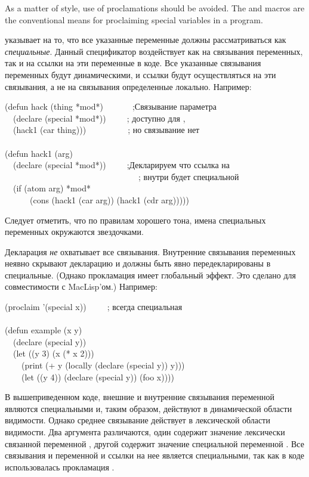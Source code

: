 \begin{flushdesc}
As a matter of style, use of  proclamations should be
avoided.  The  and  macros
are the conventional means for proclaiming special variables
in a program.

\item[\cdf{special}]
 указывает на то, что все указанные
переменные должны рассматриваться как \emph{специальные}.
Данный спецификатор воздействует как на связывания переменных, так и на ссылки
на эти переменные в коде.
Все указанные связывания переменных будут динамическими, и ссылки будут
осуществляться на эти связывания, а не на связывания определенные локально.
Например:
\begin{lisp}
(defun hack (thing *mod*)~~~~~~~;\textrm{Связывание параметра} \\
~~(declare (special *mod*))~~~~~; \textrm{ доступно для ,} \\
~~(hack1 (car thing)))~~~~~~~~~~; \textrm{но связывание  нет} \\
 \\
(defun hack1 (arg) \\
~~(declare (special *mod*))~~~~~;\textrm{Декларируем что ссылка на } \\
~~~~~~~~~~~~~~~~~~~~~~~~~~~~~~~~; \textrm{внутри  будет специальной} \\
~~(if (atom arg) *mod* \\
~~~~~~(cons (hack1 (car arg)) (hack1 (cdr arg)))))
\end{lisp}
Следует отметить, что по правилам хорошего тона, имена специальных переменных
окружаются звездочками.

Декларация  \emph{не} охватывает все связывания.
Внутренние связывания переменных неявно скрывают декларацию  и
должны быть явно передекларированы в специальные.
(Однако прокламация  имеет глобальный эффект. Это сделано для
совместимости с MacLisp'ом.)
Например:
\begin{lisp}
(proclaim '(special x))~~~~~;\textrm{ всегда специальная} \\
 \\
(defun example (x y) \\
~~(declare (special y)) \\
~~(let ((y 3) (x (* x 2))) \\
~~~~(print (+ y (locally (declare (special y)) y))) \\
~~~~(let ((y 4)) (declare (special y)) (foo x))))
\end{lisp}
В вышеприведенном коде, внешние и внутренние связывания переменной 
являются специальными и, таким образом, действуют в динамической области
видимости. Однако среднее связывание действует в лексической области
видимости. Два аргумента \cdf{+} различаются, один содержит значение 
лексически связанной переменной , другой содержит значение специальной
переменной .
Все связывания и переменной  и ссылки на нее является специальными,
так как в коде использовалась прокламация .


\end{flushdesc}
